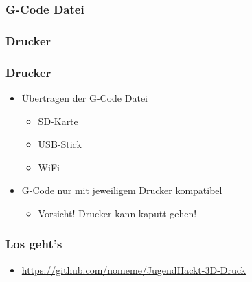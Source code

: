 {
\begin{frame}
  \frametitle{G-Code Datei}
\end{frame}
}
{
\begin{frame}
  \frametitle{Drucker}
\end{frame}
}
{
\begin{frame}
  \frametitle{Drucker}
  \begin{itemize}
    \item Übertragen der G-Code Datei \pause
    \begin{itemize}
      \item SD-Karte \pause
      \item USB-Stick \pause
      \item WiFi \pause
    \end{itemize}
    \item G-Code nur mit jeweiligem Drucker kompatibel \pause
    \begin{itemize}
      \item Vorsicht! Drucker kann kaputt gehen!
    \end{itemize}
  \end{itemize}
\end{frame}
}
{
\begin{frame}
  \frametitle{Los geht's}
  \begin{itemize}
    \item \href{https://github.com/nomeme/JugendHackt-3D-Druck}{https://github.com/nomeme/JugendHackt-3D-Druck}
  \end{itemize}
\end{frame}
}
